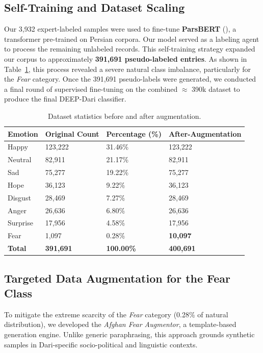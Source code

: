 \documentclass[runningheads]{llncs}
\begin{document}
\subsection{Self-Training and Dataset Scaling}
Our 3,932 expert-labeled samples were used to fine-tune \textbf{ParsBERT} (), a transformer pre-trained on Persian corpora. Our model served as a labeling agent to process the remaining unlabeled records. This self-training strategy expanded our corpus to approximately \textbf{391,691 pseudo-labeled entries}. As shown in Table~\ref{tab:dataset_stats}, this process revealed a severe natural class imbalance, particularly for the \textit{Fear} category.
Once the 391,691 pseudo-labels were generated, we conducted a final round of supervised fine-tuning on the combined $\approx$ 390k  dataset to produce the final DEEP-Dari classifier.
\begin{table}[H]
\centering
\caption{Dataset statistics before and after augmentation.}
\label{tab:dataset_stats}
\begin{tabular}{@{}p{3.0cm}p{3.0cm}p{3.0cm}p{3.0cm}@{}}
\toprule
\textbf{Emotion} & \textbf{Original Count} & \textbf{Percentage (\%)} & \textbf{After-Augmentation} \\ \midrule
Happy    & 123,222 & 31.46\% & 123,222 \\
Neutral  & 82,911  & 21.17\% & 82,911  \\
Sad      & 75,277  & 19.22\% & 75,277  \\
Hope     & 36,123  & 9.22\%  & 36,123  \\
Disgust  & 28,469  & 7.27\%  & 28,469  \\
Anger    & 26,636  & 6.80\%  & 26,636  \\
Surprise & 17,956  & 4.58\%  & 17,956  \\
Fear     & 1,097   & 0.28\%  & \textbf{10,097} \\ \midrule
\textbf{Total} & \textbf{391,691} & \textbf{100.00\%} & \textbf{400,691} \\ \bottomrule
\end{tabular}
\end{table}
\subsection{Targeted Data Augmentation for the Fear Class}
\label{sec:arg}
To mitigate the extreme scarcity of the \textit{Fear} category (0.28\% of natural 
distribution), we developed the \textit{Afghan Fear Augmentor}, a template-based 
generation engine. Unlike generic paraphrasing, this approach grounds synthetic 
samples in Dari-specific socio-political and linguistic contexts.
\end{document}
